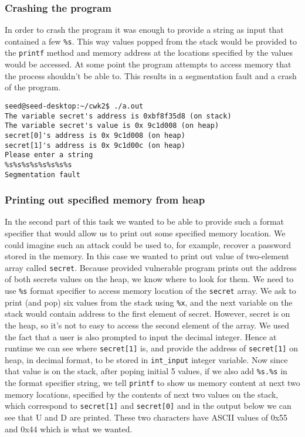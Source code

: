 \documentclass[12pt, a4paper, pdflatex]{article}
\begin{document}
\subsubsection{Crashing the program}
In order to crash the program it was enough to provide a string as input that contained a few \texttt{\%s}. This way values popped from the stack would be provided to the \texttt{printf} method and memory address at the locations specified by the values would be accessed. At some point the program attempts to access memory that the process shouldn't be able to. This results in a segmentation fault and a crash of the program.

\vspace{1em}
\lstset{
	captionpos=b,
	frame=single,
	language=bash,
  breaklines=true,
	caption=Example of crashing the program,
	label=printf:crash,
  float=tb
}
\begin{lstlisting}
seed@seed-desktop:~/cwk2$ ./a.out 
The variable secret's address is 0xbf8f35d8 (on stack)
The variable secret's value is 0x 9c1d008 (on heap)
secret[0]'s address is 0x 9c1d008 (on heap)
secret[1]'s address is 0x 9c1d00c (on heap)
Please enter a string
%s%s%s%s%s%s%s%s
Segmentation fault
\end{lstlisting}

\subsubsection{Printing out specified memory from heap}
In the second part of this task we wanted to be able to provide such a format specifier that would allow us to print out some specified memory location. We could imagine such an attack could be used to, for example, recover a password stored in the memory. In this case we wanted to print out value of two-element array called \texttt{secret}. Because provided vulnerable program prints out the address of both secrets values on the heap, we know where to look for them. We need to use \texttt{\%s} format specifier to access memory location of the \texttt{secret} array. We ask to print (and pop) six values from the stack using \texttt{\%x}, and the next variable on the stack would contain address to the first element of secret. However, secret is on the heap, so it's not to easy to access the second element of the array. We used the fact that a user is also prompted to input the decimal integer. Hence at runtime we can see where \texttt{secret[1]} is, and provide the address of \texttt{secret[1]} on heap, in decimal format, to be stored in \texttt{int\_input} integer variable. Now since that value is on the stack, after poping initial 5 values, if we also add \texttt{\%s.\%s} in the format specifier string, we tell \texttt{printf} to show us memory content at next two memory locations, specified by the contents of next two values on the stack, which correspond to \texttt{secret[1]} and \texttt{secret[0]} and in the output below we can see that U and D are printed. These two characters have ASCII values of 0x55 and 0x44 which is what we wanted.
\end{document}

